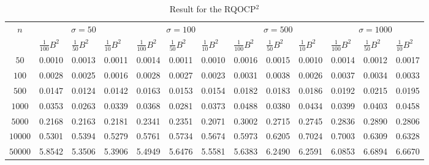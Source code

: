 \documentclass{article}
\theoremstyle{plain}
\begin{document}
\begin{table}[H]
\small
\centering
\caption{Result for the RQOCP$^2$}
\label{tab2}
\begin{tabular}{|c|lll|lll|lll|lll|}
\hline
\multirow{2}{*}{$n$}  
 & \multicolumn{3}{c|}{$\sigma=50$} & \multicolumn{3}{c|}{$\sigma=100$} & \multicolumn{3}{c|}{$\sigma=500$} &\multicolumn{3}{c|}{$\sigma=1000$}\\
\cline{2-13}
 & $\frac{1}{100}B^2$ & $\frac{1}{50} B^2$ & $\frac{1}{10}B^2$ & $\frac{1}{100}B^2$ & $\frac{1}{50} B^2$ & $\frac{1}{10}B^2$ & $\frac{1}{100}B^2$ & $\frac{1}{50} B^2$ & $\frac{1}{10}B^2$ & $\frac{1}{100}B^2$ & $\frac{1}{50} B^2$ & $\frac{1}{10}B^2$\\
\hline
$50$ & 0.0010 & 0.0013  & 0.0011 & 0.0014 & 0.0011 &0.0010 & 0.0016 & 0.0015  &0.0010 & 0.0014 & 0.0012  &0.0017  \\
\hline
$100$ & 0.0028 & 0.0025  & 0.0016 & 0.0028 & 0.0027 & 0.0023 & 0.0031 & 0.0038& 0.0026& 0.0037 & 0.0034  & 0.0033 \\
\hline
$500$ & 0.0147 &  0.0124 & 0.0142 & 0.0163 & 0.0153 & 0.0154& 0.0182 &  0.0183 &0.0186 & 0.0192 & 0.0215  & 0.0195 \\
\hline
$1000$ & 0.0353 & 0.0263  & 0.0339 & 0.0368 & 0.0281 &0.0373 & 0.0488 & 0.0380  &0.0434 & 0.0399 & 0.0403  &0.0458  \\
\hline
$5000$ & 0.2168 & 0.2163  & 0.2181 & 0.2341 & 0.2351 &0.2071 & 0.3002 & 0.2715  &0.2745 & 0.2836 & 0.2890  & 0.2806 \\
\hline
$10000$ &0.5301  & 0.5394  & 0.5279 & 0.5761 & 0.5734 &0.5674 & 0.5973 & 0.6205  & 0.7024& 0.7003 & 0.6309  &0.6328  \\
\hline
$50000$ & 5.8542 & 5.3506  & 5.3906 & 5.4949 & 5.6476 &5.5581 & 5.6383 & 6.2490  & 6.2591 & 6.0853 &  6.6894 &6.6670  \\
\hline
\end{tabular}
\end{table}
\end{document}
